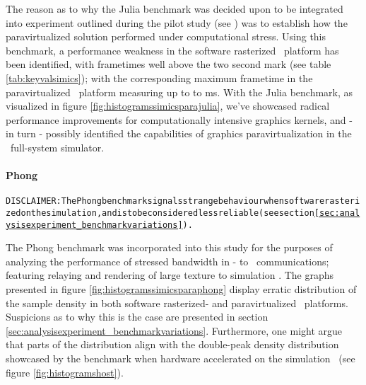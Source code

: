 The reason as to why the Julia benchmark was decided upon to be integrated into experiment outlined during the pilot study (see ) was to establish how the paravirtualized solution performed under computational stress.
Using this benchmark, a performance weakness in the software rasterized \dvttermsimics\ platform has been identified, with frametimes well above the two second mark (see table \ref{tab:keyvalsimics}); with the corresponding maximum frametime in the paravirtualized \dvttermsimics\ platform measuring up to to  ms.
With the Julia benchmark, as visualized in figure \ref{fig:histogramssimicsparajulia}, we've showcased radical performance improvements for computationally intensive graphics kernels, and - in turn - possibly identified the capabilities of graphics paravirtualization in the \dvttermsimics\ full-system simulator.


\paragraph{Phong}
\label{par:analysisexperiment_phong}
\begin{alltt}
DISCLAIMER: The Phong benchmark signals strange behaviour when software rasterized on the simulation \dvttermhost , and is to be considered less reliable (see section \ref{sec:analysisexperiment_benchmarkvariations}).
\end{alltt}

\noindent
The Phong benchmark was incorporated into this study for the purposes of analyzing the performance of stressed bandwidth in \dvttermtarget - to \dvttermhost\ communications; featuring relaying and rendering of large texture to simulation \dvttermhost .
The graphs presented in figure \ref{fig:histogramssimicsparaphong} display erratic distribution of the sample density in both software rasterized- and paravirtualized \dvttermsimics\ platforms.
Suspicions as to why this is the case are presented in section \ref{sec:analysisexperiment_benchmarkvariations}.
Furthermore, one might argue that parts of the distribution align with the double-peak density distribution showcased by the benchmark when hardware accelerated on the simulation \dvttermhost\ (see figure \ref{fig:histogramshost}).

